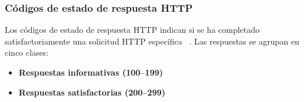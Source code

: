 \subsubsection{Códigos de estado de respuesta HTTP}
Los códigos de estado de respuesta HTTP indican si se ha completado satisfactoriamente una solicitud HTTP específica ~\cite{HTTP-codigos-MDN}. Las respuestas se agrupan en cinco clases:
\begin{itemize}
	\item \textbf{Respuestas informativas (100–199)}
	
	\item \textbf{Respuestas satisfactorias (200–299)}
	

\end{itemize}
